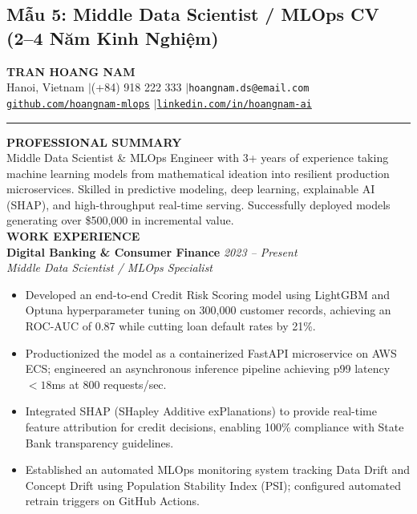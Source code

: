 \subsection{Mẫu 5: Middle Data Scientist / MLOps CV (2--4 Năm Kinh Nghiệm)}
\begin{samplecvbox}
{\centering
    {\LARGE \textbf{TRAN HOANG NAM}}\\[2pt]
    \small Hanoi, Vietnam \enspace$|$\enspace (+84) 918 222 333 \enspace$|$\enspace \texttt{hoangnam.ds@email.com}\\
    \href{https://github.com/hoangnam-mlops}{\texttt{github.com/hoangnam-mlops}} \enspace$|$\enspace \href{https://linkedin.com/in/hoangnam-ai}{\texttt{linkedin.com/in/hoangnam-ai}}\\[6pt]
}
\hrule\vspace{6pt}

\textbf{\large PROFESSIONAL SUMMARY}\\
Middle Data Scientist \& MLOps Engineer with 3+ years of experience taking machine learning models from mathematical ideation into resilient production microservices. Skilled in predictive modeling, deep learning, explainable AI (SHAP), and high-throughput real-time serving. Successfully deployed models generating over \$500,000 in incremental value.\\[6pt]

\textbf{\large WORK EXPERIENCE}\\
\textbf{Digital Banking \& Consumer Finance} \hfill \textit{2023 -- Present}\\
\textit{Middle Data Scientist / MLOps Specialist}
\begin{itemize}[leftmargin=12pt, nosep]
    \item Developed an end-to-end Credit Risk Scoring model using LightGBM and Optuna hyperparameter tuning on 300,000 customer records, achieving an ROC-AUC of 0.87 while cutting loan default rates by 21\%.
    \item Productionized the model as a containerized FastAPI microservice on AWS ECS; engineered an asynchronous inference pipeline achieving p99 latency $< 18$ms at 800 requests/sec.
    \item Integrated SHAP (SHapley Additive exPlanations) to provide real-time feature attribution for credit decisions, enabling 100\% compliance with State Bank transparency guidelines.
    \item Established an automated MLOps monitoring system tracking Data Drift and Concept Drift using Population Stability Index (PSI); configured automated retrain triggers on GitHub Actions.
\end{itemize}\vspace{4pt}


\end{samplecvbox}

